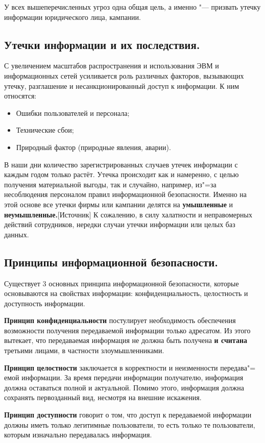 У всех вышеперечисленных угроз одна общая цель, а именно "--- призвать утечку информации юридического лица, кампании.

\newpage
\subsection{Утечки информации и их последствия.}
С увеличением масштабов распространения и использования ЭВМ и информационных сетей усиливается роль различных факторов, вызывающих утечку, 
разглашение и несанкционированный доступ к информации. К ним относятся:
\begin{itemize}
    \item Ошибки пользователей и персонала;
    \item Технические сбои;
    \item Природный фактор (природные явления, аварии).
\end{itemize}
В наши дни количество зарегистрированных случаев утечек информации с каждым годом только растёт. Утечка происходит как и намеренно, с целью получения
материальной выгоды, так и случайно, например, из"=за несоблюдения персоналом правил информационной безопасности. Именно на этой основе все утечки фирмы или кампании
делятся на \textbf{умышленные} и \textbf{неумышленные.}[Источник] К сожалению, в силу халатности и неправомерных действий сотрудников, нередки случаи утечки информации или целых
баз данных.

\subsection{Принципы информационной безопасности.}
Существует 3 основных принципа информационной безопасности, которые основываются на свойствах информации: конфиденциальность, целостность и доступность информации.

\textbf{Принцип конфиденциальности} постулирует необходимость обеспечения возможности получения передаваемой информации только адресатом. Из этого вытекает, что передаваемая информация
не должна быть получена \textbf{и считана} третьими лицами, в частности злоумышленниками.

\textbf{Принцип целостности} заключается в корректности и неизменности передава"=
емой информации. За время передачи информации получателю, информация должна оставаться полной и актуальной.
Помимо этого, информация должна сохранять первозданный вид, несмотря на внешние искажения.

\textbf{Принцип доступности} говорит о том, что доступ к передаваемой информации должны иметь только легитимные пользователи, то есть только те пользователи, которым изначально
передавалась информация.

